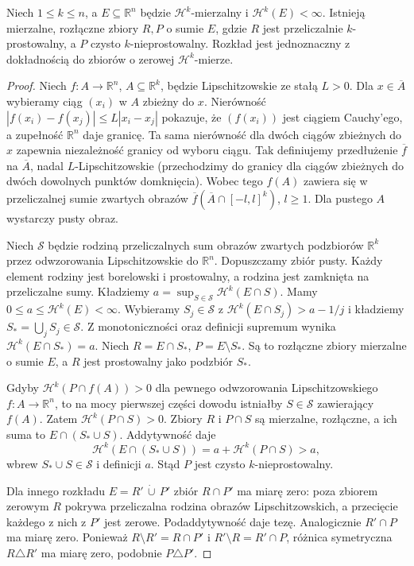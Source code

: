 \begin{twierdzenie}
\label{thm:rectifiable-decomposition-29}
Niech $1\le k\le n$, a $E\subseteq\mathbb R^n$ będzie
$\mathcal H^k$-mierzalny i $\mathcal H^k(E)<\infty$.
Istnieją mierzalne, rozłączne zbiory $R,P$ o sumie $E$,
gdzie $R$ jest przeliczalnie $k$-prostowalny, a $P$
czysto $k$-nieprostowalny. Rozkład jest jednoznaczny
z dokładnością do zbiorów o zerowej $\mathcal H^k$-mierze.
\end{twierdzenie}
\begin{proof}
Niech $f:A\to\mathbb R^n$, $A\subseteq\mathbb R^k$,
będzie Lipschitzowskie ze stałą $L>0$.
Dla $x\in\overline A$ wybieramy ciąg $(x_i)$ w $A$
zbieżny do $x$. Nierówność
$|f(x_i)-f(x_j)|\le L|x_i-x_j|$ pokazuje, że
$(f(x_i))$ jest ciągiem Cauchy'ego, a zupełność
$\mathbb R^n$ daje granicę. Ta sama nierówność
dla dwóch ciągów zbieżnych do $x$ zapewnia niezależność
granicy od wyboru ciągu. Tak definiujemy przedłużenie
$\overline f$ na $\overline A$, nadal $L$-Lipschitzowskie
(przechodzimy do granicy dla ciągów zbieżnych do dwóch
dowolnych punktów domknięcia).
Wobec tego $f(A)$ zawiera się w przeliczalnej sumie
zwartych obrazów $\overline f(\overline A\cap[-l,l]^k)$,
$l\ge1$. Dla pustego $A$ wystarczy pusty obraz.

Niech $\mathcal S$ będzie rodziną przeliczalnych sum
obrazów zwartych podzbiorów $\mathbb R^k$ przez
odwzorowania Lipschitzowskie do $\mathbb R^n$.
Dopuszczamy zbiór pusty. Każdy element rodziny jest
borelowski i prostowalny, a rodzina jest zamknięta
na przeliczalne sumy. Kładziemy
$a=\sup_{S\in\mathcal S}\mathcal H^k(E\cap S)$.
Mamy $0\le a\le\mathcal H^k(E)<\infty$.
Wybieramy $S_j\in\mathcal S$ z
$\mathcal H^k(E\cap S_j)>a-1/j$ i kładziemy
$S_*=\bigcup_j S_j\in\mathcal S$.
Z monotoniczności oraz definicji supremum wynika
$\mathcal H^k(E\cap S_*)=a$.
Niech $R=E\cap S_*$, $P=E\setminus S_*$.
Są to rozłączne zbiory mierzalne o sumie $E$,
a $R$ jest prostowalny jako podzbiór $S_*$.

Gdyby $\mathcal H^k(P\cap f(A))>0$ dla pewnego
odwzorowania Lipschitzowskiego $f:A\to\mathbb R^n$,
to na mocy pierwszej części dowodu istniałby
$S\in\mathcal S$ zawierający $f(A)$.
Zatem $\mathcal H^k(P\cap S)>0$. Zbiory $R$ i $P\cap S$
są mierzalne, rozłączne, a ich suma to $E\cap(S_*\cup S)$.
Addytywność daje
\[
 \mathcal H^k(E\cap(S_*\cup S))
 =a+\mathcal H^k(P\cap S)>a,
\]
wbrew $S_*\cup S\in\mathcal S$ i definicji $a$.
Stąd $P$ jest czysto $k$-nieprostowalny.

Dla innego rozkładu $E=R'\,\dot\cup\,P'$ zbiór
$R\cap P'$ ma miarę zero: poza zbiorem zerowym
$R$ pokrywa przeliczalna rodzina obrazów Lipschitzowskich,
a przecięcie każdego z nich z $P'$ jest zerowe.
Podaddytywność daje tezę. Analogicznie $R'\cap P$
ma miarę zero. Ponieważ $R\setminus R'=R\cap P'$
i $R'\setminus R=R'\cap P$, różnica symetryczna
$R\triangle R'$ ma miarę zero, podobnie $P\triangle P'$.
\end{proof}


